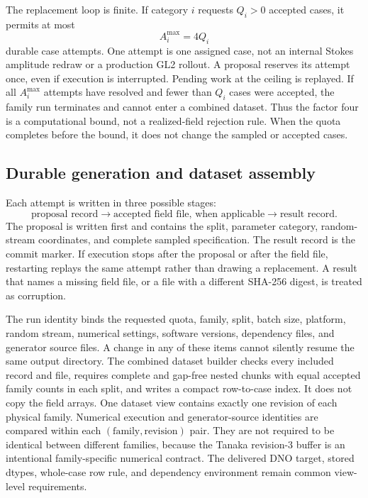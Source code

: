 \documentclass[11pt]{article}
\begin{document}
The replacement loop is finite.  If category $i$ requests $Q_i>0$ accepted cases,
it permits at most
\begin{equation}
  A_i^{\max}=4Q_i
  \label{eq:cell-attempt-ceiling}
\end{equation}
durable case attempts.  One attempt is one assigned case, not an internal
Stokes amplitude redraw or a production GL2 rollout.  A proposal reserves
its attempt once, even if execution is interrupted.  Pending work at the
ceiling is replayed.  If all $A_i^{\max}$ attempts have resolved and fewer
than $Q_i$ cases were accepted, the family run terminates and cannot enter a
combined dataset.  Thus the factor four is a computational bound, not a
realized-field rejection rule.  When the quota completes before the bound, it
does not change the sampled or accepted cases.

\subsection{Durable generation and dataset assembly}

Each attempt is written in three possible stages:
\[
  \text{proposal record}
  \longrightarrow
  \text{accepted field file, when applicable}
  \longrightarrow
  \text{result record}.
\]
The proposal is written first and contains the split, parameter category, random-stream
coordinates, and complete sampled specification.  The result record is the
commit marker.  If execution stops after the proposal or after the field
file, restarting replays the same attempt rather than drawing a replacement.
A result that names a missing field file, or a file with a different
SHA-256 digest, is treated as corruption.

The run identity binds the requested quota, family, split, batch size,
platform, random stream, numerical settings, software versions, dependency
files, and generator source files.  A change in any of these items cannot
silently resume the same output directory.  The combined dataset builder
checks every included record and file, requires complete and gap-free nested
chunks with equal accepted family counts in each split, and writes a compact
row-to-case index.  It does not copy the field arrays.
One dataset view contains exactly one revision of each physical family.
Numerical execution and generator-source identities are compared within each
$(\text{family},\text{revision})$ pair.  They are not required to be identical
between different families, because the Tanaka revision-3 buffer is an
intentional family-specific numerical contract.  The delivered DNO target,
stored dtypes, whole-case row rule, and dependency environment remain common
view-level requirements.
\end{document}

